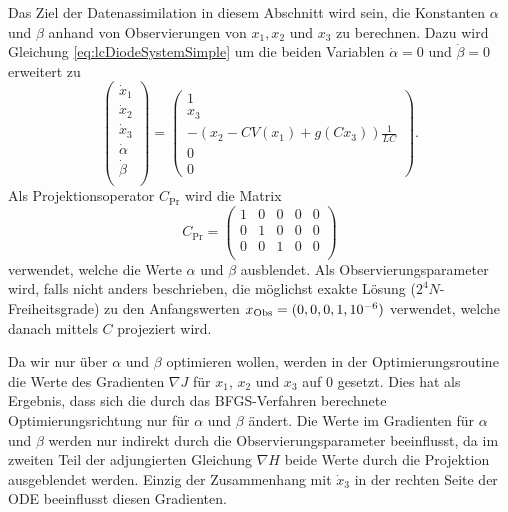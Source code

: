 
Das Ziel der Datenassimilation in diesem Abschnitt wird sein, die Konstanten $\alpha$ und $\beta$ anhand von Observierungen von $x_1,x_2$ und $x_3$ zu berechnen. Dazu wird Gleichung \eqref{eq:lcDiodeSystemSimple} um die beiden Variablen $\dot \alpha = 0$ und $\dot \beta = 0$ erweitert zu
\begin{equation}
 \begin{pmatrix}
  \dot x_1\\
  \dot x_2\\
  \dot x_3\\
  \dot \alpha\\
  \dot \beta\\
 \end{pmatrix}
 = 
 \begin{pmatrix}
  1\\
  x_3\\
  -\left(x_2-CV(x_1) + g(Cx_3)\right)\frac{1}{LC}\\
  0\\
  0
 \end{pmatrix}.
 \label{eq:lcDiodeSystemExtended}
\end{equation}
Als Projektionsoperator $C_{\text{Pr}}$ wird die Matrix 
\[C_{\text{Pr}}=
 \begin{pmatrix}
  1 &0 &0 &0 &0  \\
  0 &1 &0 &0 &0  \\
  0 &0 &1 &0 &0  \\
 \end{pmatrix}
\]
verwendet, welche die Werte $\alpha$ und $\beta$ ausblendet. Als Observierungsparameter wird, falls nicht anders beschrieben, die möglichst exakte Lösung ($2^4N$-Freiheitsgrade) zu den Anfangswerten $x_{\text{Obs}} = (0,0,0,1,10^{-6})$ verwendet, welche danach mittels $C$ projeziert wird. 

Da wir nur über $\alpha$ und $\beta$ optimieren wollen, werden in der Optimierungsroutine die Werte des Gradienten $\nabla J$ für $x_1$, $x_2$ und $x_3$ auf $0$ gesetzt. Dies hat als Ergebnis, dass sich die durch das BFGS-Verfahren berechnete Optimierungsrichtung nur für $\alpha$ und $\beta$ ändert.
Die Werte im Gradienten für $\alpha$ und $\beta$ werden nur indirekt durch die Observierungsparameter beeinflusst, da im zweiten Teil der adjungierten Gleichung $\nabla H$ beide Werte durch die Projektion ausgeblendet werden. Einzig der Zusammenhang mit $\dot x_3$ in der rechten Seite der ODE beeinflusst diesen Gradienten.

